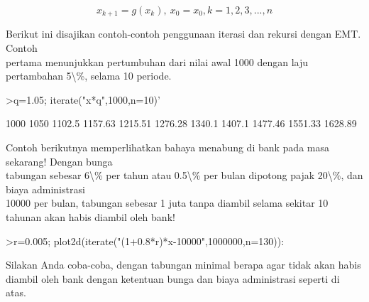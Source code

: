 \documentclass[a4paper,10pt]{article}
\begin{document}
\begin{eulernotebook}
\begin{eulercomment}
\begin{eulercomment}
\begin{eulercomment}
\begin{eulercomment}
\begin{eulercomment}
\begin{eulercomment}
\begin{eulercomment}
\begin{eulercomment}
\begin{eulercomment}
\begin{eulercomment}
\begin{eulercomment}
\begin{eulercomment}
\begin{eulercomment}
\begin{eulercomment}
\begin{eulercomment}
\begin{eulercomment}
\begin{eulercomment}
\begin{eulercomment}
\begin{eulercomment}
\begin{eulercomment}
\begin{eulercomment}
\begin{eulercomment}
\begin{eulercomment}
\begin{eulercomment}
\begin{eulercomment}
\begin{eulercomment}
\begin{eulercomment}
\begin{eulercomment}
\begin{eulercomment}
\end{eulercomment}
\begin{eulerformula}
\[
x_{k+1}=g(x_k), \ x_0=x_0, k= 1, 2, 3, ..., n
\]
\end{eulerformula}
\begin{eulercomment}
Berikut ini disajikan contoh-contoh penggunaan iterasi dan rekursi
dengan EMT. Contoh\\
pertama menunjukkan pertumbuhan dari nilai awal 1000 dengan laju
pertambahan 5\textbackslash{}\%, selama 10 periode.
\end{eulercomment}
\begin{eulerprompt}
>q=1.05; iterate("x*q",1000,n=10)'
\end{eulerprompt}
\begin{euleroutput}
           1000 
           1050 
         1102.5 
        1157.63 
        1215.51 
        1276.28 
         1340.1 
         1407.1 
        1477.46 
        1551.33 
        1628.89 
\end{euleroutput}
\begin{eulercomment}
Contoh berikutnya memperlihatkan bahaya menabung di bank pada masa
sekarang! Dengan bunga\\
tabungan sebesar 6\textbackslash{}\% per tahun atau 0.5\textbackslash{}\% per bulan dipotong pajak
20\textbackslash{}\%, dan biaya administrasi\\
10000 per bulan, tabungan sebesar 1 juta tanpa diambil selama sekitar
10 tahunan akan habis diambil oleh bank!
\end{eulercomment}
\begin{eulerprompt}
>r=0.005; plot2d(iterate("(1+0.8*r)*x-10000",1000000,n=130)):
\end{eulerprompt}
\begin{eulercomment}
Silakan Anda coba-coba, dengan tabungan minimal berapa agar tidak akan
habis diambil oleh bank dengan ketentuan bunga dan biaya administrasi
seperti di atas.


\end{eulercomment}
\end{eulercomment}
\end{eulercomment}
\end{eulercomment}
\end{eulercomment}
\end{eulercomment}
\end{eulercomment}
\end{eulercomment}
\end{eulercomment}
\end{eulercomment}
\end{eulercomment}
\end{eulercomment}
\end{eulercomment}
\end{eulercomment}
\end{eulercomment}
\end{eulercomment}
\end{eulercomment}
\end{eulercomment}
\end{eulercomment}
\end{eulercomment}
\end{eulercomment}
\end{eulercomment}
\end{eulercomment}
\end{eulercomment}
\end{eulercomment}
\end{eulercomment}
\end{eulercomment}
\end{eulercomment}
\end{eulercomment}
\end{eulernotebook}
\end{document}
